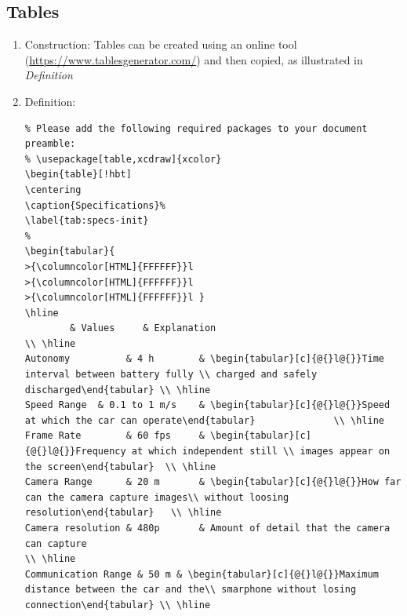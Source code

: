 \documentclass[11pt]{article}
\begin{document}
\subsection{Tables}
\label{sec:orgd573a75}
\begin{enumerate}
\item Construction: Tables can be created using an online tool
(\url{https://www.tablesgenerator.com/}) and then copied, as illustrated in
\emph{Definition}
\item Definition: 
\lstset{language=[LaTeX]TeX,label= ,caption= ,captionpos=b,numbers=none}
\begin{lstlisting}
% Please add the following required packages to your document preamble:
% \usepackage[table,xcdraw]{xcolor}
\begin{table}[!hbt]
\centering
\caption{Specifications}%
\label{tab:specs-init}
%
\begin{tabular}{
>{\columncolor[HTML]{FFFFFF}}l 
>{\columncolor[HTML]{FFFFFF}}l 
>{\columncolor[HTML]{FFFFFF}}l }
\hline
		& Values     & Explanation                                                                                                  \\ \hline
Autonomy          & 4 h        & \begin{tabular}[c]{@{}l@{}}Time interval between battery fully \\ charged and safely discharged\end{tabular} \\ \hline
Speed Range  & 0.1 to 1 m/s    & \begin{tabular}[c]{@{}l@{}}Speed at which the car can operate\end{tabular}              \\ \hline
Frame Rate        & 60 fps     & \begin{tabular}[c]{@{}l@{}}Frequency at which independent still \\ images appear on the screen\end{tabular}  \\ \hline
Camera Range      & 20 m       & \begin{tabular}[c]{@{}l@{}}How far can the camera capture images\\ without loosing resolution\end{tabular}   \\ \hline
Camera resolution & 480p       & Amount of detail that the camera can capture                                                                 \\ \hline
Communication Range & 50 m & \begin{tabular}[c]{@{}l@{}}Maximum distance between the car and the\\ smarphone without losing connection\end{tabular} \\ \hline

\end{lstlisting}
\end{enumerate}
\end{document}
